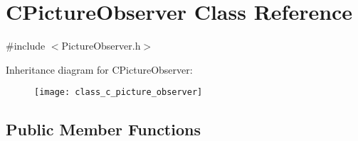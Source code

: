 \hypertarget{class_c_picture_observer}{\section{C\+Picture\+Observer Class Reference}
\label{class_c_picture_observer}
}


{\ttfamily \#include $<$Picture\+Observer.\+h$>$}

Inheritance diagram for C\+Picture\+Observer\+:\begin{figure}[H]
\begin{center}
\leavevmode
\texttt{[image: class\_c\_picture\_observer]}
\end{center}
\end{figure}
\subsection*{Public Member Functions}
